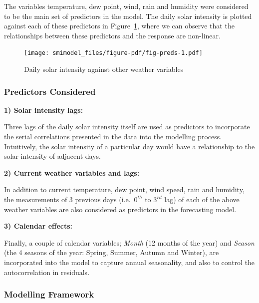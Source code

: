 \documentclass[11pt,a4paper,]{article}
\begin{document}
The variables temperature, dew point, wind, rain and humidity were
considered to be the main set of predictors in the model. The daily
solar intensity is plotted against each of these predictors in
Figure~\ref{fig-preds}, where we can observe that the relationships
between these predictors and the response are non-linear.

\begin{figure}

{\centering \texttt{[image: smimodel\_files/figure-pdf/fig-preds-1.pdf]}

}

\caption{\label{fig-preds}Daily solar intensity against other weather
variables}

\end{figure}

\hypertarget{predictors-considered-1}{%
\subsubsection{Predictors Considered}\label{predictors-considered-1}}

\textbf{1) Solar intensity lags:}

Three lags of the daily solar intensity itself are used as predictors to
incorporate the serial correlations presented in the data into the
modelling process. Intuitively, the solar intensity of a particular day
would have a relationship to the solar intensity of adjacent days.

\textbf{2) Current weather variables and lags:}

In addition to current temperature, dew point, wind speed, rain and
humidity, the measurements of 3 previous days (i.e.~\(0^{th}\) to
\(3^{rd}\) lag) of each of the above weather variables are also
considered as predictors in the forecasting model.

\textbf{3) Calendar effects:}

Finally, a couple of calendar variables; \emph{Month} (12 months of the
year) and \emph{Season} (the 4 seasons of the year: Spring, Summer,
Autumn and Winter), are incorporated into the model to capture annual
seasonality, and also to control the autocorrelation in residuals.

\hypertarget{modelling-framework-1}{%
\subsubsection{Modelling Framework}\label{modelling-framework-1}}
\end{document}

